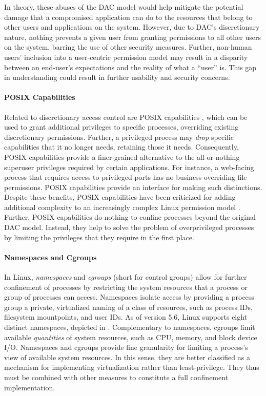 In theory, these abuses of the DAC model would help mitigate the potential damage that a compromised application can do to the resources that belong to other users and applications on the system. However, due to DAC's discretionary nature, nothing prevents a given user from granting permissions to all other users on the system, barring the use of other security measures. Further, non-human users' inclusion into a user-centric permission model may result in a disparity between an end-user's expectations and the reality of what a \enquote{user} is. This gap in understanding could result in further usability and security concerns.

\paragraph*{POSIX Capabilities}

Related to discretionary access control are POSIX capabilities \cite{posix_capabilities,corbet2006_capabities_a,corbet2006_capabities_b}, which can be used to grant additional privileges to specific processes, overriding existing discretionary permissions. Further, a privileged process may \textit{drop} specific capabilities that it no longer needs, retaining those it needs. Consequently, POSIX capabilities provide a finer-grained alternative to the all-or-nothing superuser privileges required by certain applications. For instance, a web-facing process that requires access to privileged ports has no business overriding file permissions. POSIX capabilities provide an interface for making such distinctions. Despite these benefits, POSIX capabilities have been criticized for adding additional complexity to an increasingly complex Linux permission model \cite{corbet2006_capabities_b,corbet2006_capabities_a}.  Further, POSIX capabilities do nothing to confine processes beyond the original DAC model. Instead, they help to solve the problem of overprivileged processes by limiting the privileges that they require in the first place.

\paragraph*{Namespaces and Cgroups}

In Linux, \textit{namespaces} and \textit{cgroups} (short for control groups) allow for further confinement of processes by restricting the system resources that a process or group of processes can access. Namespaces isolate access by providing a process group a private, virtualized naming of a class of resources, such as process IDs, filesystem mountpoints, and user IDs. As of version 5.6, Linux supports eight distinct namespaces, depicted in .  Complementary to namespaces, cgroups limit available \textit{quantities} of system resources, such as CPU, memory, and block device I/O.  Namespaces and cgroups provide fine granularity for limiting a process's view of available system resources. In this sense, they are better classified as a mechanism for implementing virtualization rather than least-privilege. They thus must be combined with other measures to constitute a full confinement implementation.

